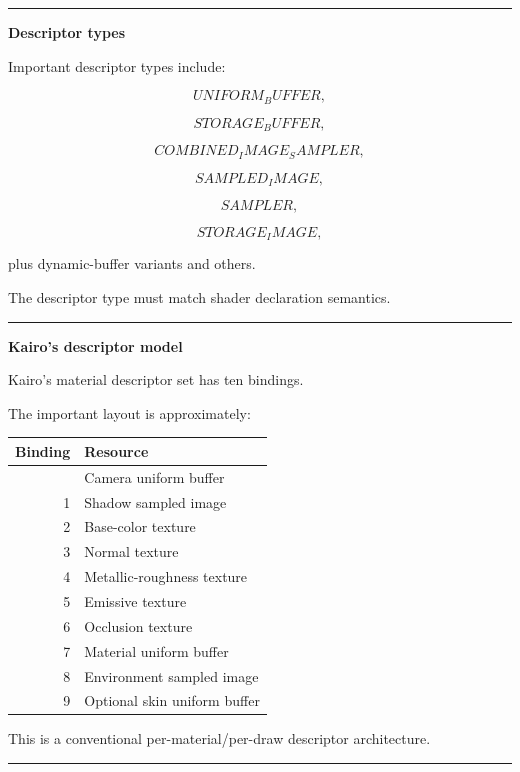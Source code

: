 \begin{center}\rule{0.5\linewidth}{0.5pt}\end{center}

\textbf{Descriptor types}

Important descriptor types include:

\[
UNIFORM_BUFFER,
\]

\[
STORAGE_BUFFER,
\]

\[
COMBINED_IMAGE_SAMPLER,
\]

\[
SAMPLED_IMAGE,
\]

\[
SAMPLER,
\]

\[
STORAGE_IMAGE,
\]

plus dynamic-buffer variants and others.

The descriptor type must match shader declaration semantics.

\begin{center}\rule{0.5\linewidth}{0.5pt}\end{center}

\textbf{Kairo's descriptor model}

Kairo's material descriptor set has ten bindings.

The important layout is approximately:

{\def\LTcaptype{none} %
\begin{longtable}[]{@{}rl@{}}
\toprule\noalign{}
Binding & Resource \\
\midrule\noalign{}
\endhead
\bottomrule\noalign{}
\endlastfoot
0 & Camera uniform buffer \\
1 & Shadow sampled image \\
2 & Base-color texture \\
3 & Normal texture \\
4 & Metallic-roughness texture \\
5 & Emissive texture \\
6 & Occlusion texture \\
7 & Material uniform buffer \\
8 & Environment sampled image \\
9 & Optional skin uniform buffer \\
\end{longtable}
}

This is a conventional per-material/per-draw descriptor architecture.

\begin{center}\rule{0.5\linewidth}{0.5pt}\end{center}

